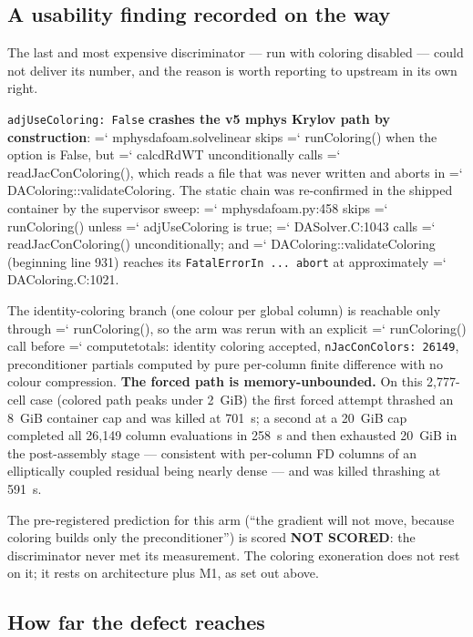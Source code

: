 \documentclass[11pt,a4paper]{article}
\newcommand{\artifact}[1]{{\small\ttfamily\hyphenchar\font=`\-\relax
  \def\_{\textunderscore\allowbreak}#1}}
\begin{document}
\subsection{A usability finding recorded on the way}

The last and most expensive discriminator --- run with coloring disabled --- could not
deliver its number, and the reason is worth reporting to upstream in its own right.

\texttt{adjUseColoring: False} \textbf{crashes the v5 mphys Krylov path by construction}:
\artifact{mphys\_dafoam.solve\_linear} skips \artifact{runColoring()} when the option is
False, but \artifact{calcdRdWT} unconditionally calls \artifact{readJacConColoring()}, which
reads a file that was never written and aborts in
\artifact{DAColoring::validateColoring}. The static chain was re-confirmed in the shipped
container by the supervisor sweep: \artifact{mphys\_dafoam.py:458} skips
\artifact{runColoring()} unless \artifact{adjUseColoring} is true;
\artifact{DASolver.C:1043} calls \artifact{readJacConColoring()} unconditionally; and
\artifact{DAColoring::validateColoring} (beginning line 931) reaches its
\texttt{FatalErrorIn ... abort} at approximately \artifact{DAColoring.C:1021}.

The identity-coloring branch (one colour per global column) is reachable only through
\artifact{runColoring()}, so the arm was rerun with an explicit \artifact{runColoring()} call
before \artifact{compute\_totals}: identity coloring accepted,
\texttt{nJacConColors: 26149}, preconditioner partials computed by pure per-column finite
difference with no colour compression. \textbf{The forced path is memory-unbounded.} On this
2{,}777-cell case (colored path peaks under 2~GiB) the first forced attempt thrashed an 8~GiB
container cap and was killed at 701~s; a second at a 20~GiB cap completed all 26{,}149 column
evaluations in 258~s and then exhausted 20~GiB in the post-assembly stage --- consistent with
per-column FD columns of an elliptically coupled residual being nearly dense --- and was
killed thrashing at 591~s.

The pre-registered prediction for this arm (``the gradient will not move, because coloring
builds only the preconditioner'') is scored \textbf{NOT SCORED}: the discriminator never met
its measurement. The coloring exoneration does not rest on it; it rests on architecture plus
M1, as set out above.

\subsection{How far the defect reaches}
\end{document}
